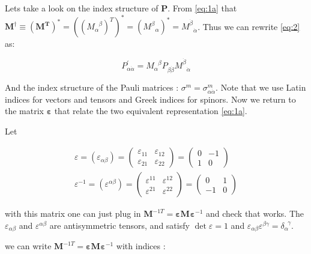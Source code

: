  
 
 Lets take a look on the index structure of  $\mathbf{P}$. From \eqref{eq:1a} that  $\mathbf{M}^{\dagger} \equiv \mathbf{({M}^{T})^{*}} = ((M_{\alpha}^{\,\,\,\,\beta})^{T})^{*}  = (M_{\,\,\,\,\alpha}^{\beta})^{*}  =M_{\,\,\,\,\dot{\alpha}}^{\dot{\beta}} $. Thus we can rewrite \eqref{eq:2} as:
 
 \begin{equation}
  P_{\alpha \dot{\alpha}}^{'} =M_{\alpha}^{\,\,\,\,\beta} P_{\beta \dot{\beta}} M_{\,\,\,\,\dot{\alpha}}^{\dot{\beta}}
 \end{equation}
 
And the index structure of the Pauli matrices :  $\sigma ^{m} = \sigma ^{m}_{\alpha \dot{\alpha}}$. Note that we use Latin indices for vectors and tensors and Greek indices for spinors.
Now we return to the matrix $\mathbf{\varepsilon}$ that relate the two equivalent representation \eqref{eq:1a}.


Let


\begin{align}
\varepsilon = (\varepsilon_{\alpha \beta})=
\begin{pmatrix} 
\varepsilon_{11} &\varepsilon_{12}\\
\varepsilon_{21} & \varepsilon_{22} 
\end{pmatrix} =
\begin{pmatrix} 
0 &-1\\
1 & 0 
\end{pmatrix}\\
\varepsilon^{-1} = (\varepsilon^{\alpha \beta})=
\begin{pmatrix} 
\varepsilon^{11} &\varepsilon^{12}\\
\varepsilon^{21} & \varepsilon^{22} 
\end{pmatrix} =
\begin{pmatrix} 
0 &1\\
-1 & 0 
\end{pmatrix} 
\end{align}

with this matrix one can just plug in $\mathbf{M}^{-1T} = \mathbf{\varepsilon} \mathbf{M}^{} \mathbf{\varepsilon}^{-1}$ and check that works. The $\varepsilon_{\alpha \beta}$ and  $\varepsilon^{\alpha \beta}$ are antisymmetric tensors, and satisfy $\det \varepsilon = 1$ and $\varepsilon_{\alpha \beta} \varepsilon^{\beta \gamma} = \delta^{ \;\;\gamma}_{\alpha} $. 

we can write  $\mathbf{M}^{-1T} = \mathbf{\varepsilon} \mathbf{M}^{} \mathbf{\varepsilon}^{-1}$ with indices :

